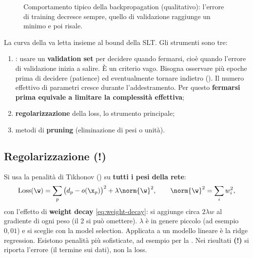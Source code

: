 \begin{figure}[ht]
\centering
{}
\caption{Comportamento tipico della backpropagation (qualitativo): l'errore di training decresce sempre, quello
di validazione raggiunge un minimo e poi risale.}
\label{fig:early-stopping}
\end{figure}

La curva della  va letta insieme al bound della SLT. Gli strumenti sono tre:
\begin{enumerate}
  \item {}\label{sec:early-stopping}: usare un \textbf{validation set} per decidere quando
        fermarsi, cioè quando l'errore di validazione inizia a salire. È un criterio vago. Bisogna osservare più
        epoche prima di decidere (patience) ed eventualmente tornare indietro (). Il numero
        effettivo di parametri cresce durante l'addestramento. Per questo \textbf{fermarsi prima equivale a
        limitare la complessità effettiva};
  \item \textbf{regolarizzazione} della loss, lo strumento principale;
  \item metodi di \textbf{pruning} (eliminazione di pesi o unità).
\end{enumerate}

\subsection{Regolarizzazione (!)}

Si usa la penalità di Tikhonov () su \textbf{tutti i pesi della rete}:
\[
\mathrm{Loss}(\w) = \sum_p\big(d_p - o(\x_p)\big)^2 + \lambda\norm{\w}^2,\qquad \norm{\w}^2 = \sum_iw_i^2 ,
\]
con l'effetto di \textbf{weight decay} \eqref{eq:weight-decay}: si aggiunge circa $2\lambda w$ al gradiente di ogni
peso (il 2 si può omettere). $\lambda$ è in genere piccolo (ad esempio $0{,}01$) e si sceglie con la model
selection. Applicata a un modello lineare è la ridge regression. Esistono penalità più sofisticate, ad esempio
per la . Nei risultati \textbf{(!)} si riporta l'errore (il termine sui dati), non la
loss.

